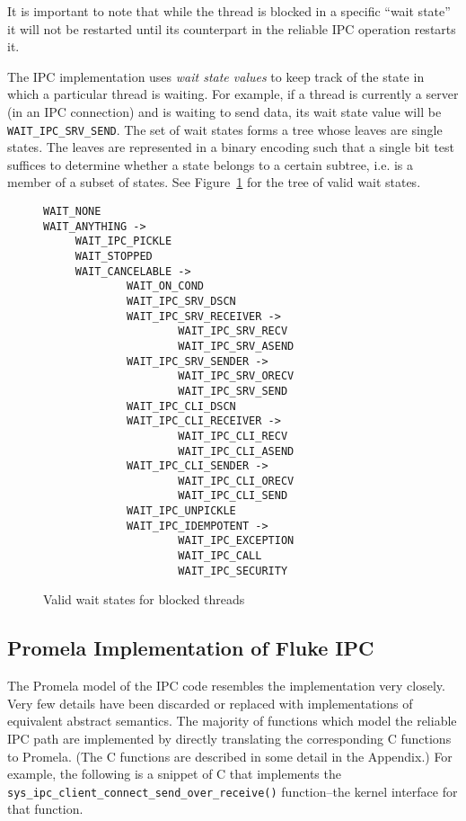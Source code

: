 It is important to note that while the 
thread is blocked in a specific ``wait state'' it will not
be restarted until its counterpart in the reliable IPC operation
restarts it.

The IPC implementation uses {\it wait state values} to keep track of
the state in which a particular thread is waiting. For example, if a
thread is currently a server (in an IPC connection) and is waiting to
send data, its wait state value will be {\tt WAIT_IPC_SRV_SEND}.
The set of wait states forms a tree whose
leaves are single states. The leaves are represented in a binary
encoding such that a single bit test suffices to determine whether
a state belongs to a certain subtree, i.e. is a member of a subset of 
states.   See Figure~\ref{waitStates.fig} for the tree of valid
wait states.

\begin{figure}[th]
{\small
\begin{verbatim}
WAIT_NONE
WAIT_ANYTHING ->
     WAIT_IPC_PICKLE
     WAIT_STOPPED
     WAIT_CANCELABLE ->
             WAIT_ON_COND
             WAIT_IPC_SRV_DSCN
             WAIT_IPC_SRV_RECEIVER ->
                     WAIT_IPC_SRV_RECV
                     WAIT_IPC_SRV_ASEND
             WAIT_IPC_SRV_SENDER ->
                     WAIT_IPC_SRV_ORECV
                     WAIT_IPC_SRV_SEND
             WAIT_IPC_CLI_DSCN
             WAIT_IPC_CLI_RECEIVER ->
                     WAIT_IPC_CLI_RECV
                     WAIT_IPC_CLI_ASEND
             WAIT_IPC_CLI_SENDER ->
                     WAIT_IPC_CLI_ORECV
                     WAIT_IPC_CLI_SEND
             WAIT_IPC_UNPICKLE
             WAIT_IPC_IDEMPOTENT ->
                     WAIT_IPC_EXCEPTION
                     WAIT_IPC_CALL
                     WAIT_IPC_SECURITY
\end{verbatim}
} %
\caption{Valid wait states for blocked threads}
\label{waitStates.fig}
\end{figure}


\subsection{Promela Implementation of Fluke IPC}

The Promela model of the IPC code resembles the implementation very closely. 
Very few details have been discarded or replaced with implementations
of equivalent abstract semantics. 
The majority of functions which model the reliable IPC path are 
implemented by directly translating the corresponding C functions to 
Promela. (The C functions are described in some detail in the Appendix.)
For example, the following is a snippet of C that implements the
{\tt sys_ipc_client_connect_send_over_receive()} function--the
kernel interface for that function.

